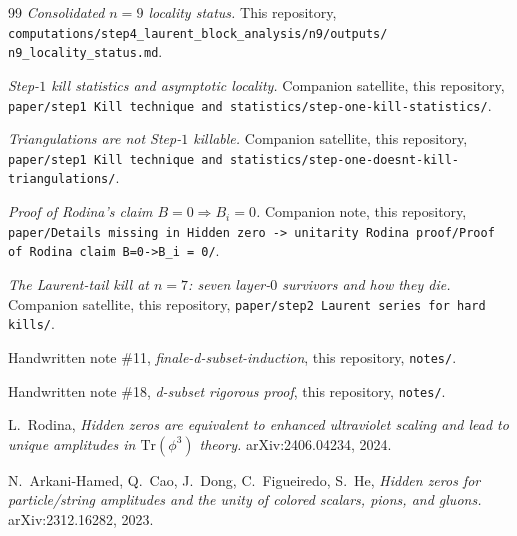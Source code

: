 \documentclass[11pt]{article}
\theoremstyle{definition}
\begin{document}
\begin{thebibliography}{99}
\emph{Consolidated $n=9$ locality status.} This repository,
\verb|computations/step4_laurent_block_analysis/n9/outputs/|
\verb|n9_locality_status.md|.

\emph{Step-$1$ kill statistics and asymptotic locality.} Companion
satellite, this repository,
\verb|paper/step1 Kill technique and statistics/step-one-kill-statistics/|.

\emph{Triangulations are not Step-$1$ killable.} Companion
satellite, this repository,
\verb|paper/step1 Kill technique and statistics/step-one-doesnt-kill-triangulations/|.

\emph{Proof of Rodina's claim $B=0\Rightarrow B_i=0$.} Companion
note, this repository,
\verb|paper/Details missing in Hidden zero -> unitarity Rodina proof/Proof of Rodina claim B=0->B_i = 0/|.

\emph{The Laurent-tail kill at $n=7$: seven layer-$0$ survivors
and how they die.} Companion satellite, this repository,
\verb|paper/step2 Laurent series for hard kills/|.

Handwritten note \#11, \emph{finale-d-subset-induction}, this
repository, \verb|notes/|.

Handwritten note \#18, \emph{d-subset rigorous proof}, this
repository, \verb|notes/|.

L.~Rodina, \emph{Hidden zeros are equivalent to enhanced
ultraviolet scaling and lead to unique amplitudes in
$\mathrm{Tr}(\phi^3)$ theory.} arXiv:2406.04234, 2024.

N.~Arkani-Hamed, Q.~Cao, J.~Dong, C.~Figueiredo, S.~He,
\emph{Hidden zeros for particle/string amplitudes and the unity of
colored scalars, pions, and gluons.} arXiv:2312.16282, 2023.
\end{thebibliography}
\end{document}
